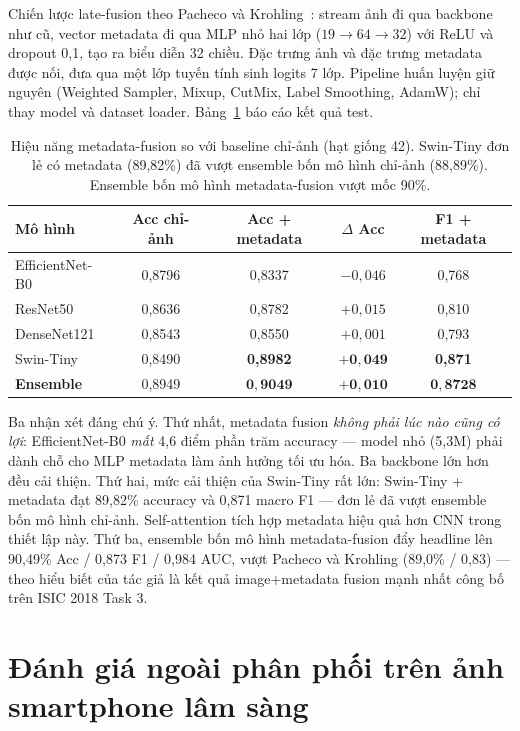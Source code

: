 Chiến lược late-fusion theo Pacheco và Krohling~\cite{pacheco2020metadata}: stream ảnh đi qua backbone như cũ, vector metadata đi qua MLP nhỏ hai lớp ($19 \rightarrow 64 \rightarrow 32$) với ReLU và dropout 0,1, tạo ra biểu diễn 32 chiều. Đặc trưng ảnh và đặc trưng metadata được nối, đưa qua một lớp tuyến tính sinh logits 7 lớp. Pipeline huấn luyện giữ nguyên (Weighted Sampler, Mixup, CutMix, Label Smoothing, AdamW); chỉ thay model và dataset loader. Bảng~\ref{tab:meta_fusion_vn} báo cáo kết quả test.

\begin{table}[H]
\centering
\caption{Hiệu năng metadata-fusion so với baseline chỉ-ảnh (hạt giống 42). Swin-Tiny đơn lẻ có metadata (89,82\%) đã vượt ensemble bốn mô hình chỉ-ảnh (88,89\%). Ensemble bốn mô hình metadata-fusion vượt mốc 90\%.}
\label{tab:meta_fusion_vn}
\begin{tabular}{lcccc}
\toprule
\textbf{Mô hình} & \textbf{Acc chỉ-ảnh} & \textbf{Acc + metadata} & \textbf{$\Delta$ Acc} & \textbf{F1 + metadata} \\
\midrule
EfficientNet-B0 & 0,8796 & 0,8337 & $-0{,}046$ & 0,768 \\
ResNet50        & 0,8636 & 0,8782 & $+0{,}015$ & 0,810 \\
DenseNet121     & 0,8543 & 0,8550 & $+0{,}001$ & 0,793 \\
Swin-Tiny       & 0,8490 & \textbf{0,8982} & $\mathbf{+0{,}049}$ & \textbf{0,871} \\
\midrule
\textbf{Ensemble} & 0,8949 & $\mathbf{0{,}9049}$ & $\mathbf{+0{,}010}$ & $\mathbf{0{,}8728}$ \\
\bottomrule
\end{tabular}
\end{table}

Ba nhận xét đáng chú ý. Thứ nhất, metadata fusion \textit{không phải lúc nào cũng có lợi}: EfficientNet-B0 \textit{mất} 4,6 điểm phần trăm accuracy --- model nhỏ (5,3M) phải dành chỗ cho MLP metadata làm ảnh hưởng tối ưu hóa. Ba backbone lớn hơn đều cải thiện. Thứ hai, mức cải thiện của Swin-Tiny rất lớn: Swin-Tiny + metadata đạt 89,82\% accuracy và 0,871 macro F1 --- đơn lẻ đã vượt ensemble bốn mô hình chỉ-ảnh. Self-attention tích hợp metadata hiệu quả hơn CNN trong thiết lập này. Thứ ba, ensemble bốn mô hình metadata-fusion đẩy headline lên 90,49\% Acc / 0,873 F1 / 0,984 AUC, vượt Pacheco và Krohling (89,0\% / 0,83) --- theo hiểu biết của tác giả là kết quả image+metadata fusion mạnh nhất công bố trên ISIC 2018 Task 3.

\section{Đánh giá ngoài phân phối trên ảnh smartphone lâm sàng}

